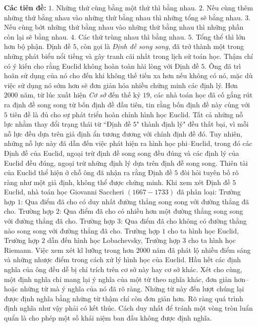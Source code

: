 \begin{multicols}{2}
	\vskip 0.1cm
	\textbf{\color{lichsutoanhoc}Các tiên đề:}
	\vskip 0.1cm
	$1.$ Những thứ cùng bằng một thứ thì bằng nhau.
	\vskip 0.1cm
	$2.$ Nếu cùng thêm những thứ bằng nhau vào những thứ bằng nhau thì những tổng sẽ bằng nhau.
	\vskip 0.1cm
	$3.$ Nếu cùng bớt những thứ bằng nhau vào những thứ bằng nhau thì những phần còn lại sẽ bằng nhau.
	\vskip 0.1cm
	$4.$ Các thứ trùng nhau thì bằng nhau.
	\vskip 0.1cm
	$5.$ Tổng thể thì lớn hơn bộ phận.
	\vskip 0.1cm
	Định đề $5$, còn gọi là \textit{Định đề song song}, đã trở thành một trong những phát biểu nổi tiếng và gây tranh cãi nhất trong lịch sử toán học. Thậm chí có ý kiến cho rằng Euclid không hoàn toàn hài lòng với Định đề $5$. Ông đã trì hoãn sử dụng của nó cho đến khi không thế tiến xa hơn nếu không có nó, mặc dù việc sử dụng nó sớm hơn sẽ đơn giản hóa nhiều chứng minh các định lý.
	\vskip 0.1cm
	Hơn $2000$ năm, từ lúc xuất hiện \textit{Cơ sở} đến thế kỷ $19$, các nhà toán học đã cố gắng rút ra định đề song song từ bốn định đề đầu tiên, tin rằng bốn định đề này cùng với $5$ tiên đề là đủ cho sự phát triển hoàn chỉnh hình học Euclid. Tất cả những nỗ lực nhằm thay đổi trạng thái từ ``Định đề $5$" thành định lý" đều thất bại, vì mỗi nỗ lực đều dựa trên giả định ẩn tương đương với chính định đề đó. 
	\vskip 0.1cm
	Tuy nhiên, những nỗ lực này đã dẫn đến việc phát hiện ra hình học phi--Euclid, trong đó các Định đề của Euclid, ngoại trừ định đề song song đều đúng và các định lý của Euclid đều đúng, ngoại trừ những định lý dựa trên định đề song song. Thiên tài của Euclid thể hiện ở chỗ ông đã nhận ra rằng Định đề $5$ đòi hỏi tuyên bố rõ ràng như một giả định, không thể được chứng minh.   
	\vskip 0.1cm
	Khi xem xét Định đề $5$ Euclid, nhà toán học Giovanni Saccheri $(1667-1733)$ đã phân loại:
	\vskip 0.1cm
	Trường hợp $1$: Qua điểm đã cho có duy nhất đường thẳng song song với đường thẳng đã cho.
	\vskip 0.1cm
	Trường hợp $2$: Qua điểm đã cho có nhiều hơn một đường thẳng song song với đường thẳng đã cho.
	\vskip 0.1cm
	Trường hợp $3$: Qua điểm đã cho không có đường thẳng nào song song với đường thẳng đã cho.
	\vskip 0.1cm
	Trường hợp $1$ cho ta hình học Euclid, Trường hợp $2$ dẫn đến hình học Lobachevsky, Trường hợp $3$ cho ta hình học Riemann.
	\vskip 0.1cm
	Việc xem xét kĩ lưỡng trong hơn $2000$ năm đã phát lộ nhiều điểm sáng và những nhược điểm trong cách xử lý hình học của Euclid. Hầu hết các định nghĩa của ông đều dễ bị chỉ trích trên cơ sở này hay cơ sở khác. Xét cho cùng, một định nghĩa chỉ mang lại ý nghĩa của một từ theo nghĩa khác, đơn giản hơn--hoặc những từ mà ý nghĩa của nó đã rõ ràng. Những từ này đến lượt chúng lại được định nghĩa bằng những từ thậm chí còn đơn giản hơn. Rõ ràng quá trình định nghĩa như vậy phải có kết thúc. Cách duy nhất để tránh một vòng tròn luẩn quẩn là cho phép một số khái niệm ban đầu không được định nghĩa.

\end{multicols}
